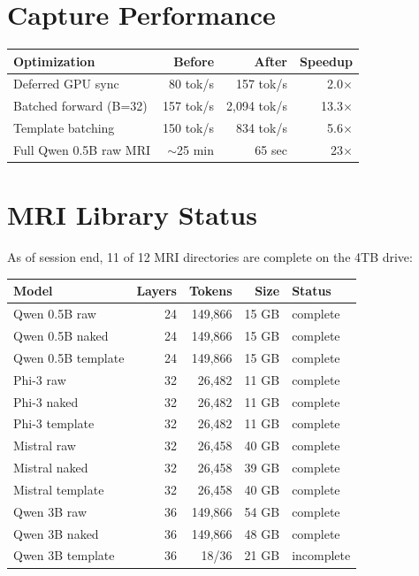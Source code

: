 \documentclass[11pt,a4paper]{report}
\begin{document}
\section{Capture Performance}

\begin{center}
\begin{tabular}{lrrr}
\toprule
\textbf{Optimization} & \textbf{Before} & \textbf{After} & \textbf{Speedup} \\
\midrule
Deferred GPU sync & 80 tok/s & 157 tok/s & 2.0$\times$ \\
Batched forward (B=32) & 157 tok/s & 2,094 tok/s & 13.3$\times$ \\
Template batching & 150 tok/s & 834 tok/s & 5.6$\times$ \\
\midrule
Full Qwen 0.5B raw MRI & $\sim$25 min & 65 sec & 23$\times$ \\
\bottomrule
\end{tabular}
\end{center}

\section{MRI Library Status}

As of session end, 11 of 12 MRI directories are complete on the 4TB drive:

\begin{center}
\begin{tabular}{lrrrl}
\toprule
\textbf{Model} & \textbf{Layers} & \textbf{Tokens} & \textbf{Size} & \textbf{Status} \\
\midrule
Qwen 0.5B raw & 24 & 149,866 & 15 GB & complete \\
Qwen 0.5B naked & 24 & 149,866 & 15 GB & complete \\
Qwen 0.5B template & 24 & 149,866 & 15 GB & complete \\
Phi-3 raw & 32 & 26,482 & 11 GB & complete \\
Phi-3 naked & 32 & 26,482 & 11 GB & complete \\
Phi-3 template & 32 & 26,482 & 11 GB & complete \\
Mistral raw & 32 & 26,458 & 40 GB & complete \\
Mistral naked & 32 & 26,458 & 39 GB & complete \\
Mistral template & 32 & 26,458 & 40 GB & complete \\
Qwen 3B raw & 36 & 149,866 & 54 GB & complete \\
Qwen 3B naked & 36 & 149,866 & 48 GB & complete \\
Qwen 3B template & 36 & 18/36 & 21 GB & incomplete \\
\bottomrule
\end{tabular}
\end{center}
\end{document}
